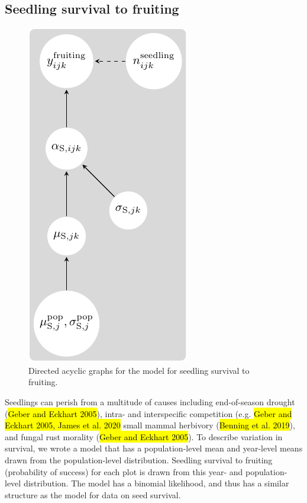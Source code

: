 \documentclass[12pt, oneside, titlepage]{article}   	%
\begin{document}
\subsection{Seedling survival to fruiting}

\begin{figure}
       \includegraphics[scale=1]{../../manuscript/figures/dag-survival.pdf}  
    \caption{ Directed acyclic graphs for the model for seedling survival to fruiting. }
 \label{fig:dag-survival}
\end{figure}

Seedlings can perish from a multitude of causes including end-of-season drought (\hl{Geber and Eckhart 2005}), intra- and interspecific competition (e.g. \hl{Geber and Eckhart 2005, James et al. 2020} small mammal herbivory (\hl{Benning et al. 2019}), and fungal rust morality (\hl{Geber and Eckhart 2005}). To describe variation in survival, we wrote a model that has a population-level mean and year-level means drawn from the population-level distribution. Seedling survival to fruiting (probability of success) for each plot is drawn from this year- and population-level distribution. The model has a binomial likelihood, and thus has a similar structure as the model for data on seed survival.
\end{document}
